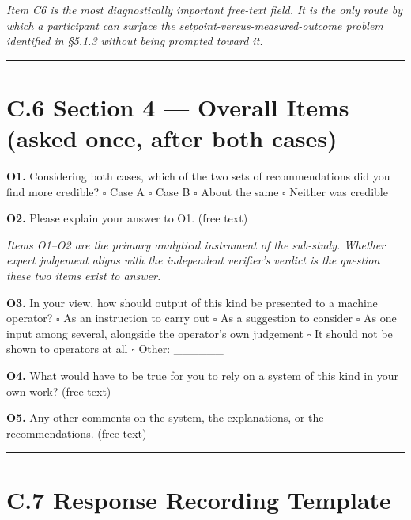 \emph{Item C6 is the most diagnostically important free-text field. It is the only route by which a participant can surface the setpoint-versus-measured-outcome problem identified in §5.1.3 without being prompted toward it.}

\begin{center}\rule{0.5\linewidth}{0.5pt}\end{center}

\hypertarget{c.6-section-4-overall-items-asked-once-after-both-cases}{%
\section{C.6 Section 4 --- Overall Items (asked once, after both cases)}\label{c.6-section-4-overall-items-asked-once-after-both-cases}}

\textbf{O1.} Considering both cases, which of the two sets of recommendations did you find more credible?
$\square$ Case A $\square$ Case B $\square$ About the same $\square$ Neither was credible

\textbf{O2.} Please explain your answer to O1. (free text)

\emph{Items O1--O2 are the primary analytical instrument of the sub-study. Whether expert judgement aligns with the independent verifier's verdict is the question these two items exist to answer.}

\textbf{O3.} In your view, how should output of this kind be presented to a machine operator?
$\square$ As an instruction to carry out
$\square$ As a suggestion to consider
$\square$ As one input among several, alongside the operator's own judgement
$\square$ It should not be shown to operators at all
$\square$ Other: \_\_\_\_\_\_

\textbf{O4.} What would have to be true for you to rely on a system of this kind in your own work? (free text)

\textbf{O5.} Any other comments on the system, the explanations, or the recommendations. (free text)

\begin{center}\rule{0.5\linewidth}{0.5pt}\end{center}

\hypertarget{c.7-response-recording-template}{%
\section{C.7 Response Recording Template}\label{c.7-response-recording-template}}

